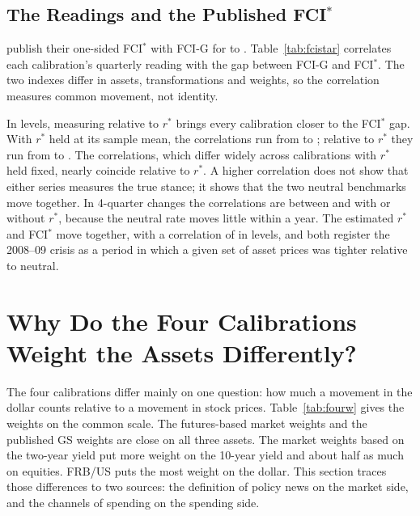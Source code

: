 \subsection{The Readings and the Published FCI$^*$}\label{sec:fcistardata}
\citet{caballero2026} publish their one-sided FCI$^*$ with FCI-G for  to . Table~\ref{tab:fcistar} correlates each calibration's quarterly reading with the gap between FCI-G and FCI$^*$. The two indexes differ in assets, transformations and weights, so the correlation measures common movement, not identity.



In levels, measuring relative to $r^*$ brings every calibration closer to the FCI$^*$ gap. With $r^*$ held at its sample mean, the correlations run from  to ; relative to $r^*$ they run from  to . The correlations, which differ widely across calibrations with $r^*$ held fixed, nearly coincide relative to $r^*$. A higher correlation does not show that either series measures the true stance; it shows that the two neutral benchmarks move together. In 4-quarter changes the correlations are between  and  with or without $r^*$, because the neutral rate moves little within a year. The estimated $r^*$ and FCI$^*$ move together, with a correlation of  in levels, and both register the 2008--09 crisis as a period in which a given set of asset prices was tighter relative to neutral.
\FloatBarrier

\section{Why Do the Four Calibrations Weight the Assets Differently?}\label{sec:agree}
The four calibrations differ mainly on one question: how much a movement in the dollar counts relative to a movement in stock prices. Table~\ref{tab:fourw} gives the weights on the common scale. The futures-based market weights and the published GS weights are close on all three assets. The market weights based on the two-year yield put more weight on the 10-year yield and about half as much on equities. FRB/US puts the most weight on the dollar. This section traces those differences to two sources: the definition of policy news on the market side, and the channels of spending on the spending side.

